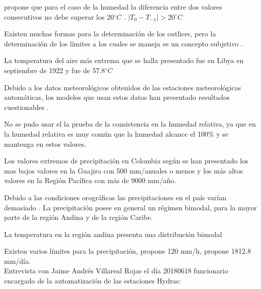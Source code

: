 \documentclass[11pt]{article}
\def\celc{$^{\circ}C$ }%
\begin{document}
\citep{Graybeal2004b} propone que para el caso de la humedad la diferencia entre dos valores consecutivos no debe superar los 20\celc. $|T_0 - T_{-1}| > 20^{\circ}C$
 
Existen muchas formas para la determinación de los outliers, pero la determinación de los límites a los cuales se maneja es un concepto subjetivo \citet{Graybeal2004b}.

La temperatura del aire más extrema que se halla presentado fue en Libya en septiembre de 1922 y fue de 57.8\celc \citep{Kubecka2001}

Debido a los datos meteorológicos obtenidos de las estaciones meteorológicas automáticas, los modelos que usan estos datos han presentado resultados cuestionables \citep{Meek1994}.

No se pudo usar el la prueba de la consistencia en la humedad relativa, ya que en la humedad relativa es muy común que la humedad alcance el 100\% y se mantenga en estos valores.

Los valores extremos de precipitación en Colombia según \citet{Arango2014} se han presentado los mas bajos valores en la Guajira con 500 mm/anuales o menos y los más altos valores en la Región Pacífica con más de 9000 mm/año.

Debido a las condiciones orográficas las precipitaciones en el país varían demasiado \citep{Arango2014}. La precipitación posee en general un régimen bimodal, para la mayor parte de la región Andina y de la región Caribe.

La temperatura en la región andina presenta una distribución bimodal

Existen varios límites para la precipitación, \citet{Estevez2011} propone 120 mm/h, \citet{Feng2004} propone 1812.8 mm/día.\\

Entrevista con Jaime Andrés Villareal Rojas el día 20180618 funcionario encargado de la automatización de las estaciones Hydras:
\end{document}
